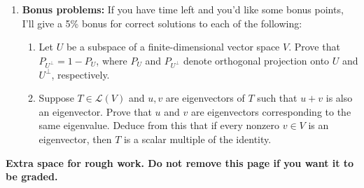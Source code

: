 \documentclass[12pt]{article}
\renewcommand{\L}{\mathcal{L}}
\begin{document}
\begin{enumerate}
\newpage



\newpage

\item {\bf Bonus problems:} If you have time left and you'd like some bonus points, I'll give a 5\% bonus for correct solutions to each of the following:
\begin{enumerate}
 \item Let $U$ be a subspace of a finite-dimensional vector space $V$. Prove that $P_{U^\bot} = 1-P_U$, where $P_U$ and $P_{U^\bot}$ denote orthogonal projection onto $U$ and $U^\bot$, respectively.
 \item Suppose $T\in\L(V)$ and $u,v$ are eigenvectors of $T$ such that $u+v$ is also an eigenvector. Prove that $u$ and $v$ are eigenvectors corresponding to the same eigenvalue. Deduce from this that if every nonzero $v\in V$ is an eigenvector, then $T$ is a scalar multiple of the identity.
\end{enumerate}

\end{enumerate}
\newpage

\begin{center}
 {\bf Extra space for rough work. Do not remove this page if you want it to be graded.}
\end{center}
\end{document}
